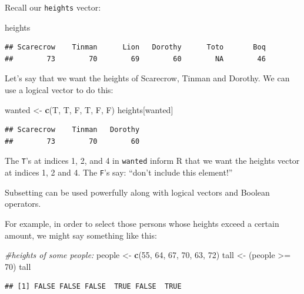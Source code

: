 \documentclass[]{book}
\makeatletter
\newenvironment{Shaded}{\begin{snugshade}}{\end{snugshade}}
\newcommand{\KeywordTok}[1]{\textcolor[rgb]{0.13,0.29,0.53}{\textbf{{#1}}}}
\newcommand{\DecValTok}[1]{\textcolor[rgb]{0.00,0.00,0.81}{{#1}}}
\newcommand{\StringTok}[1]{\textcolor[rgb]{0.31,0.60,0.02}{{#1}}}
\newcommand{\CommentTok}[1]{\textcolor[rgb]{0.56,0.35,0.01}{\textit{{#1}}}}
\newcommand{\NormalTok}[1]{{#1}}
\newenvironment{kframe}{%
\medskip{}
\setlength{\fboxsep}{.8em}
 \def\at@end@of@kframe{}%
 \ifinner\ifhmode%
  \def\at@end@of@kframe{\end{minipage}}%
  \begin{minipage}{\columnwidth}%
 \fi\fi%
 \def\FrameCommand##1{\hskip\@totalleftmargin \hskip-\fboxsep
 \colorbox{shadecolor}{##1}\hskip-\fboxsep
     \hskip-\linewidth \hskip-\@totalleftmargin \hskip\columnwidth}%
 \MakeFramed {\advance\hsize-\width
   \@totalleftmargin\z@ \linewidth\hsize
   \@setminipage}}%
 {\par\unskip\endMakeFramed%
 \at@end@of@kframe}
\renewenvironment{Shaded}{\begin{kframe}}{\end{kframe}}
\theoremstyle{definition}
\theoremstyle{definition}
\theoremstyle{remark}
\makeatother
\begin{document}
Recall our \texttt{heights} vector:

\begin{Shaded}
\begin{Highlighting}[]
\NormalTok{heights}
\end{Highlighting}
\end{Shaded}

\begin{verbatim}
## Scarecrow    Tinman      Lion   Dorothy      Toto       Boq 
##        73        70        69        60        NA        46
\end{verbatim}

Let's say that we want the heights of Scarecrow, Tinman and Dorothy. We
can use a logical vector to do this:

\begin{Shaded}
\begin{Highlighting}[]
\NormalTok{wanted <-}\StringTok{ }\KeywordTok{c}\NormalTok{(T, T, F, T, F, F)}
\NormalTok{heights[wanted]}
\end{Highlighting}
\end{Shaded}

\begin{verbatim}
## Scarecrow    Tinman   Dorothy 
##        73        70        60
\end{verbatim}

The \texttt{T}'s at indices 1, 2, and 4 in \texttt{wanted} inform R that
we want the heights vector at indices 1, 2 and 4. The \texttt{F}'s say:
``don't include this element!''

Subsetting can be used powerfully along with logical vectors and Boolean
operators.

For example, in order to select those persons whose heights exceed a
certain amount, we might say something like this:

\begin{Shaded}
\begin{Highlighting}[]
\CommentTok{#heights of some people:}
\NormalTok{people <-}\StringTok{ }\KeywordTok{c}\NormalTok{(}\DecValTok{55}\NormalTok{, }\DecValTok{64}\NormalTok{, }\DecValTok{67}\NormalTok{, }\DecValTok{70}\NormalTok{, }\DecValTok{63}\NormalTok{, }\DecValTok{72}\NormalTok{)}
\NormalTok{tall <-}\StringTok{ }\NormalTok{(people >=}\StringTok{ }\DecValTok{70}\NormalTok{)}
\NormalTok{tall}
\end{Highlighting}
\end{Shaded}

\begin{verbatim}
## [1] FALSE FALSE FALSE  TRUE FALSE  TRUE
\end{verbatim}
\end{document}
